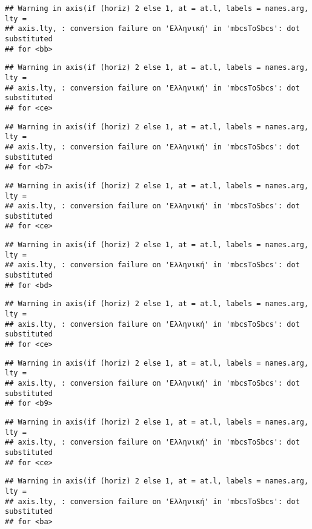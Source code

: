 \documentclass[
]{article}
\begin{document}
\begin{verbatim}
## Warning in axis(if (horiz) 2 else 1, at = at.l, labels = names.arg, lty =
## axis.lty, : conversion failure on 'Ελληνική' in 'mbcsToSbcs': dot substituted
## for <bb>
\end{verbatim}

\begin{verbatim}
## Warning in axis(if (horiz) 2 else 1, at = at.l, labels = names.arg, lty =
## axis.lty, : conversion failure on 'Ελληνική' in 'mbcsToSbcs': dot substituted
## for <ce>
\end{verbatim}

\begin{verbatim}
## Warning in axis(if (horiz) 2 else 1, at = at.l, labels = names.arg, lty =
## axis.lty, : conversion failure on 'Ελληνική' in 'mbcsToSbcs': dot substituted
## for <b7>
\end{verbatim}

\begin{verbatim}
## Warning in axis(if (horiz) 2 else 1, at = at.l, labels = names.arg, lty =
## axis.lty, : conversion failure on 'Ελληνική' in 'mbcsToSbcs': dot substituted
## for <ce>
\end{verbatim}

\begin{verbatim}
## Warning in axis(if (horiz) 2 else 1, at = at.l, labels = names.arg, lty =
## axis.lty, : conversion failure on 'Ελληνική' in 'mbcsToSbcs': dot substituted
## for <bd>
\end{verbatim}

\begin{verbatim}
## Warning in axis(if (horiz) 2 else 1, at = at.l, labels = names.arg, lty =
## axis.lty, : conversion failure on 'Ελληνική' in 'mbcsToSbcs': dot substituted
## for <ce>
\end{verbatim}

\begin{verbatim}
## Warning in axis(if (horiz) 2 else 1, at = at.l, labels = names.arg, lty =
## axis.lty, : conversion failure on 'Ελληνική' in 'mbcsToSbcs': dot substituted
## for <b9>
\end{verbatim}

\begin{verbatim}
## Warning in axis(if (horiz) 2 else 1, at = at.l, labels = names.arg, lty =
## axis.lty, : conversion failure on 'Ελληνική' in 'mbcsToSbcs': dot substituted
## for <ce>
\end{verbatim}

\begin{verbatim}
## Warning in axis(if (horiz) 2 else 1, at = at.l, labels = names.arg, lty =
## axis.lty, : conversion failure on 'Ελληνική' in 'mbcsToSbcs': dot substituted
## for <ba>
\end{verbatim}
\end{document}
